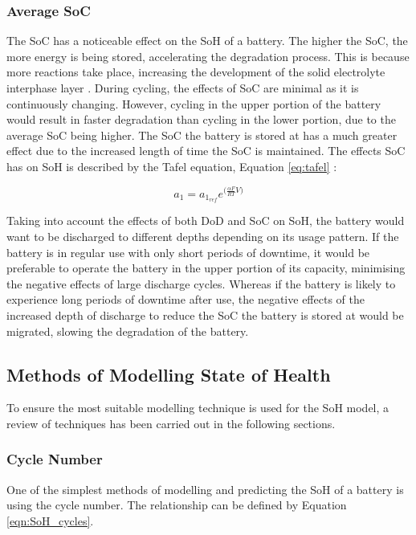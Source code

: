 \documentclass[a4paper, 10pt]{article}
\numberwithin{equation}{section}
\begin{document}
\subsubsection{Average SoC} \label{sec:aveSoC}
The SoC has a noticeable effect on the SoH of a battery. The higher the SoC, the more energy is being stored, accelerating the degradation process. This is because more reactions take place, increasing the development of the solid electrolyte interphase layer \cite{book:aveSoC}. During cycling, the effects of SoC are minimal as it is continuously changing. However, cycling in the upper portion of the battery would result in faster degradation than cycling in the lower portion, due to the average SoC being higher. The SoC the battery is stored at has a much greater effect due to the increased length of time the SoC is maintained. The effects SoC has on SoH is described by the Tafel equation, Equation \ref{eq:tafel} \cite{pres:tafel}:

\begin{equation} \label{eq:tafel}
    a_1=a_{1_{ref}}e^{\big(\frac{\alpha F}{RT}V\big)}
\end{equation}

Taking into account the effects of both DoD and SoC on SoH, the battery would want to be discharged to different depths depending on its usage pattern. If the battery is in regular use with only short periods of downtime, it would be preferable to operate the battery in the upper portion of its capacity, minimising the negative effects of large discharge cycles. Whereas if the battery is likely to experience long periods of downtime after use, the negative effects of the increased depth of discharge to reduce the SoC the battery is stored at would be migrated, slowing the degradation of the battery.

\subsection{Methods of Modelling State of Health}
To ensure the most suitable modelling technique is used for the SoH model, a review of techniques has been carried out in the following sections.

\subsubsection{Cycle Number}

One of the simplest methods of modelling and predicting the SoH of a battery is using the cycle number. The relationship can be defined by Equation \ref{eqn:SoH_cycles}.
\end{document}
